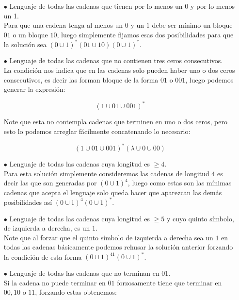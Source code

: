 \begin{itemize}
    \item[$\bullet$] Lenguaje de todas las cadenas que tienen por lo menos un 0 y por lo menos un 1.\\ 

    Para que una cadena tenga al menos un $0$ y un $1$ debe ser mínimo un bloque $01$ o un bloque $10$, luego simplemente fijamos esas dos posibilidades para que la solución sea  $(0\cup1)^*(01\cup10)(0\cup1)^*$.

    \item[$\bullet$] Lenguaje de todas las cadenas que no contienen tres ceros consecutivos.\\ 

    La condición nos indica que en las cadenas solo pueden haber uno o dos ceros consecutivos, es decir las forman bloque de la forma $01$ o $001$, luego podemos generar la expresión:

    $$(1\cup01\cup001)^*$$

    Note que esta  no contempla cadenas que terminen en uno o dos ceros, pero esto lo podemos arreglar fácilmente concatenando lo necesario:

    $$(1\cup01\cup001)^*(\lambda\cup0\cup00)$$

    \item[$\bullet$] Lenguaje de todas las cadenas cuya longitud es $\geq4.$\\ 

    Para esta solución simplemente consideremos las cadenas de longitud $4$ es decir las que son generadas por $(0\cup1)^4$, luego como estas son las mínimas cadenas que acepta el lenguaje solo queda hacer que aparezcan las demás posibilidades así $(0\cup1)^4(0\cup1)^*$.

    \item[$\bullet$] Lenguaje de todas las cadenas cuya longitud es $\geq5$ y cuyo quinto símbolo, de izquierda a derecha, es un 1.\\ 

    Note que al forzar que el quinto símbolo de izquierda a derecha sea un $1$ en todas las cadenas básicamente podemos rehusar la solución anterior forzando la condición de esta forma $(0\cup1)^41(0\cup1)^*$.

    \item[$\bullet$] Lenguaje de todas las cadenas que no terminan en 01.\\ 

    Si la cadena no puede terminar en $01$ forzosamente tiene que terminar en $00,10$ o $11$, forzando estas obtenemos:


\end{itemize}
